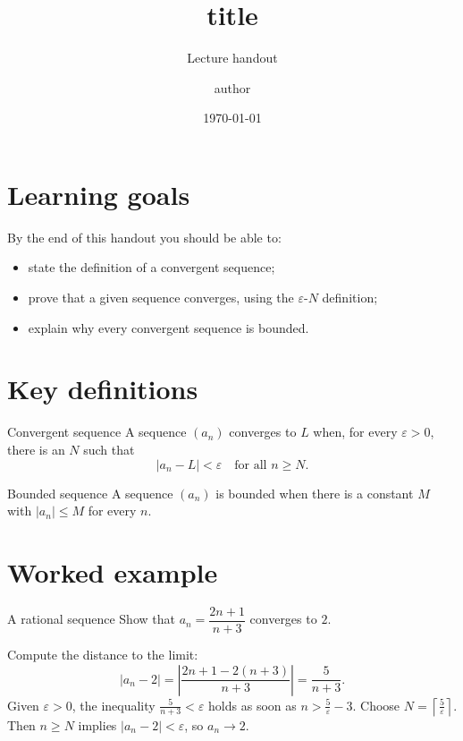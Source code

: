 \documentclass[11pt,parskip=half]{scrartcl}
\title{{{title}}}
\subtitle{Lecture handout}
\author{{{author}}}
\date{\today}
\theoremstyle{plain}
\begin{document}
\maketitle

\section{Learning goals}

By the end of this handout you should be able to:
\begin{itemize}
  \item state the definition of a convergent sequence;
  \item prove that a given sequence converges, using the $\varepsilon$-$N$ definition;
  \item explain why every convergent sequence is bounded.
\end{itemize}

\section{Key definitions}

\begin{definitionbox}{Convergent sequence}
  A sequence $(a_n)$ converges to $L$ when, for every $\varepsilon > 0$,
  there is an $N$ such that
  \[
    |a_n - L| < \varepsilon \quad \text{for all } n \ge N.
  \]
\end{definitionbox}

\begin{definitionbox}{Bounded sequence}
  A sequence $(a_n)$ is bounded when there is a constant $M$ with
  $|a_n| \le M$ for every $n$.
\end{definitionbox}

\section{Worked example}

\begin{examplebox}{A rational sequence}
  Show that $a_n = \dfrac{2n+1}{n+3}$ converges to $2$.

  Compute the distance to the limit:
  \[
    |a_n - 2| = \left|\frac{2n+1 - 2(n+3)}{n+3}\right| = \frac{5}{n+3}.
  \]
  Given $\varepsilon > 0$, the inequality $\frac{5}{n+3} < \varepsilon$ holds
  as soon as $n > \frac{5}{\varepsilon} - 3$. Choose $N = \left\lceil \frac{5}{\varepsilon} \right\rceil$.
  Then $n \ge N$ implies $|a_n - 2| < \varepsilon$, so $a_n \to 2$.
\end{examplebox}
\end{document}
